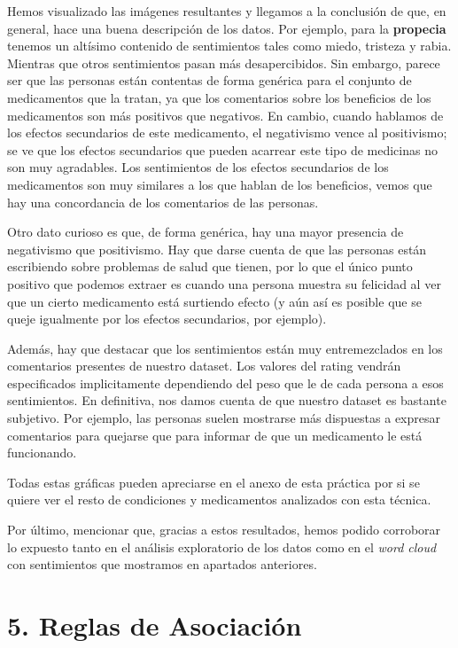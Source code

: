 \documentclass[spanish,]{article}
\begin{document}
Hemos visualizado las imágenes resultantes y llegamos a la conclusión de
que, en general, hace una buena descripción de los datos. Por ejemplo,
para la \textbf{propecia} tenemos un altísimo contenido de sentimientos
tales como miedo, tristeza y rabia. Mientras que otros sentimientos
pasan más desapercibidos. Sin embargo, parece ser que las personas están
contentas de forma genérica para el conjunto de medicamentos que la
tratan, ya que los comentarios sobre los beneficios de los medicamentos
son más positivos que negativos. En cambio, cuando hablamos de los
efectos secundarios de este medicamento, el negativismo vence al
positivismo; se ve que los efectos secundarios que pueden acarrear este
tipo de medicinas no son muy agradables. Los sentimientos de los efectos
secundarios de los medicamentos son muy similares a los que hablan de
los beneficios, vemos que hay una concordancia de los comentarios de las
personas.

Otro dato curioso es que, de forma genérica, hay una mayor presencia de
negativismo que positivismo. Hay que darse cuenta de que las personas
están escribiendo sobre problemas de salud que tienen, por lo que el
único punto positivo que podemos extraer es cuando una persona muestra
su felicidad al ver que un cierto medicamento está surtiendo efecto (y
aún así es posible que se queje igualmente por los efectos secundarios,
por ejemplo).

Además, hay que destacar que los sentimientos están muy entremezclados
en los comentarios presentes de nuestro dataset. Los valores del rating
vendrán especificados implicitamente dependiendo del peso que le de cada
persona a esos sentimientos. En definitiva, nos damos cuenta de que
nuestro dataset es bastante subjetivo. Por ejemplo, las personas suelen
mostrarse más dispuestas a expresar comentarios para quejarse que para
informar de que un medicamento le está funcionando.

Todas estas gráficas pueden apreciarse en el anexo de esta práctica por
si se quiere ver el resto de condiciones y medicamentos analizados con
esta técnica.

Por último, mencionar que, gracias a estos resultados, hemos podido
corroborar lo expuesto tanto en el análisis exploratorio de los datos
como en el \emph{word cloud} con sentimientos que mostramos en apartados
anteriores.

\newpage

\section{5. Reglas de Asociación}\label{reglas-de-asociacion}
\end{document}
